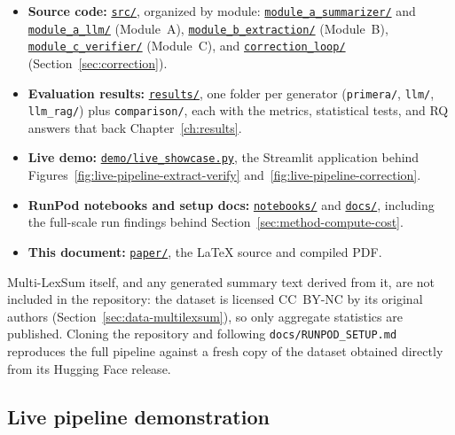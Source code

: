 \begin{itemize}
  \item \textbf{Source code:} \href{\repourl/tree/main/src}{\texttt{src/}}, organized by module: \href{\repourl/tree/main/src/module_a_summarizer}{\texttt{module\_a\_summarizer/}} and \href{\repourl/tree/main/src/module_a_llm}{\texttt{module\_a\_llm/}} (Module~A), \href{\repourl/tree/main/src/module_b_extraction}{\texttt{module\_b\_extraction/}} (Module~B), \href{\repourl/tree/main/src/module_c_verifier}{\texttt{module\_c\_verifier/}} (Module~C), and \href{\repourl/tree/main/src/correction_loop}{\texttt{correction\_loop/}} (Section~\ref{sec:correction}).
  \item \textbf{Evaluation results:} \href{\repourl/tree/main/results}{\texttt{results/}}, one folder per generator (\texttt{primera/}, \texttt{llm/}, \texttt{llm\_rag/}) plus \texttt{comparison/}, each with the metrics, statistical tests, and RQ answers that back Chapter~\ref{ch:results}.
  \item \textbf{Live demo:} \href{\repourl/blob/main/demo/live_showcase.py}{\texttt{demo/live\_showcase.py}}, the Streamlit application behind Figures~\ref{fig:live-pipeline-extract-verify} and~\ref{fig:live-pipeline-correction}.
  \item \textbf{RunPod notebooks and setup docs:} \href{\repourl/tree/main/notebooks}{\texttt{notebooks/}} and \href{\repourl/tree/main/docs}{\texttt{docs/}}, including the full-scale run findings behind Section~\ref{sec:method-compute-cost}.
  \item \textbf{This document:} \href{\repourl/tree/main/paper}{\texttt{paper/}}, the LaTeX source and compiled PDF.
\end{itemize}

Multi-LexSum itself, and any generated summary text derived from it, are not included in the repository: the dataset is licensed CC~BY-NC by its original authors (Section~\ref{sec:data-multilexsum}), so only aggregate statistics are published. Cloning the repository and following \texttt{docs/RUNPOD\_SETUP.md} reproduces the full pipeline against a fresh copy of the dataset obtained directly from its Hugging Face release.

\subsection{Live pipeline demonstration}
\label{sec:method-live-demo}

